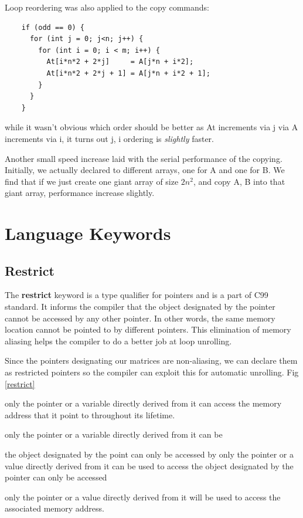 \documentclass{article}
\begin{document}
    Loop reordering was also applied to the copy commands:
    \begin{lstlisting}
    if (odd == 0) {
      for (int j = 0; j<n; j++) {
        for (int i = 0; i < m; i++) {
          At[i*n*2 + 2*j]     = A[j*n + i*2];
          At[i*n*2 + 2*j + 1] = A[j*n + i*2 + 1];
        }
      }
    }
    \end{lstlisting}

    while it wasn't obvious which order should be better as At increments via j via A increments via i, it turns out j, i ordering is \emph{slightly} faster.

    Another small speed increase laid with the serial performance of the copying. Initially, we actually declared to different arrays, one for A and one for B.
    We find that if we just create one giant array of size $2n^2$, and copy A, B into that giant array, performance increase slightly.

    \section{Language Keywords}
\subsection{Restrict}

The {\bf restrict} keyword is a type qualifier for pointers and is a part of C99 standard. It informs the compiler that the object designated by the pointer cannot be accessed by any other pointer. In other words, the same memory location cannot be pointed to by different pointers. This elimination of memory aliasing helps the compiler to do a better job at loop unrolling.

Since the pointers designating our matrices are non-aliasing, we can declare them as restricted pointers so the compiler can exploit this for automatic unrolling. Fig \ref{restrict}

 

only the pointer or a variable directly derived from it can access the memory address that it point to throughout its lifetime.

 only the pointer or a variable directly derived from it can be 

the object designated by the point can only be accessed by only the pointer or a value directly derived from it can be used to access the object designated by the pointer can only be accessed 


 only the pointer or a value directly derived from it will be used to access the associated memory address.  
\end{document}
